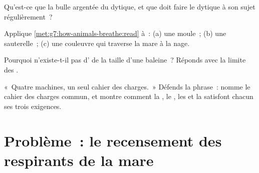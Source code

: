 \begin{exercise}[$\star\star$]\label{exo:g7:how-animals-breathe:9}
Qu'est-ce que la bulle argentée du dytique, et que doit faire le
dytique à son sujet régulièrement~?
\end{exercise}

\begin{exercise}[$\star\star$]\label{exo:g7:how-animals-breathe:10}
Applique \cref{met:g7:how-animals-breathe:read} à~: (a) une moule~;
(b) une sauterelle~; (c) une couleuvre qui traverse la mare à la
nage.
\end{exercise}

\begin{exercise}[$\star\star$]\label{exo:g7:how-animals-breathe:11}
Pourquoi n'existe-t-il pas d' de la taille d'une baleine~?
Réponds avec la limite des .
\end{exercise}

\begin{exercise}[$\star\star\star$]\label{exo:g7:how-animals-breathe:12}
«~Quatre machines, un seul cahier des charges.~» Défends la phrase~:
nomme le cahier des charges commun, et montre comment la ,
le , les  et la  satisfont chacun ses trois
exigences.
\end{exercise}

\section{Problème~: le recensement des respirants de la mare}


